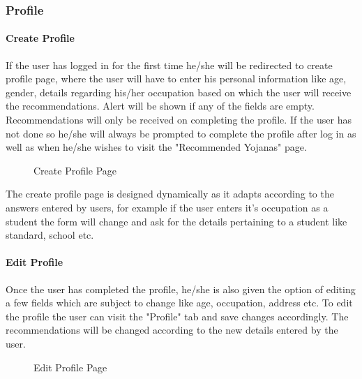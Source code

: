 \documentclass[conference]{IEEEtran}
\begin{document}
\subsubsection{Profile}
\paragraph{Create Profile}
If the user has logged in for the first time he/she will be redirected to create profile page, where the user will have to enter his personal information like age, gender, details regarding his/her occupation based on which the user will receive the recommendations. Alert will be shown if any of the fields are empty. 
Recommendations will only be received on completing the profile. If the user has not done so he/she will always be prompted to complete the profile after log in as well as when he/she wishes to visit the "Recommended Yojanas" page.
\begin{figure}[h!]
\centering
{}
\caption{Create Profile Page}
\end{figure}
The create profile page is designed dynamically as it adapts according to the answers entered by users, for example if the user enters it's occupation as a student the form will change and ask for the details pertaining to a student like standard, school etc.
\paragraph{Edit Profile}
Once the user has completed the profile, he/she is also given the option of editing a few fields which are subject to change like age, occupation, address etc. To edit the profile the user can visit the "Profile" tab  and save changes accordingly. The recommendations will be changed according to the new details entered by the user. 
\begin{figure}[h!]
\centering
{}
\caption{Edit Profile Page}
\end{figure}
\end{document}
